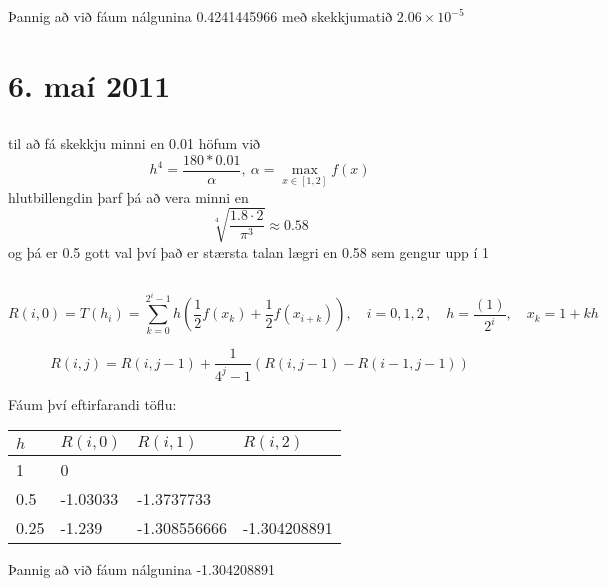 \documentclass[10pt,a4paper]{article}
\begin{document}
Þannig að við fáum nálgunina 0.4241445966 með skekkjumatið $2.06 \times 10^{-5}$

\setcounter{section}{8}

\section{6. maí 2011}
\subsection{}
til að fá skekkju minni en 0.01 höfum við $$h^4=\frac{180*0.01}{\alpha},\ \alpha = \max_{ x \in [1,2]}f(x) $$
hlutbillengdin þarf þá að vera minni en $$\sqrt[4]{\frac{1.8\cdot 2}{\pi^3}}\approx 0.58$$
og þá er 0.5 gott val því það er stærsta talan lægri en 0.58 sem gengur upp í 1 
\subsection{}
\[R(i,0)=T(h_i)=\sum_{k=0}^{2^i-1}h(\frac{1}{2}f(x_k) + \frac{1}{2}f(x_{i+k})),\quad i=0,1,2\, , \quad h=\frac{(1)}{2^i},\quad x_k =  1 + kh\]

\[
R(i,j)=R(i,j-1) + \frac{1}{4^j-1}(R(i,j-1)-R(i-1,j-1))
\]

Fáum því eftirfarandi töflu:

\begin{tabular}{l|lll}
$h$&$R(i,0)$&$R(i,1)$&$R(i,2)$\\ \hline
1	&0\\
0.5	&-1.03033&-1.3737733\\
0.25	&-1.239&-1.308556666&-1.304208891\\
\end{tabular}
Þannig að við fáum nálgunina -1.304208891
\end{document}
